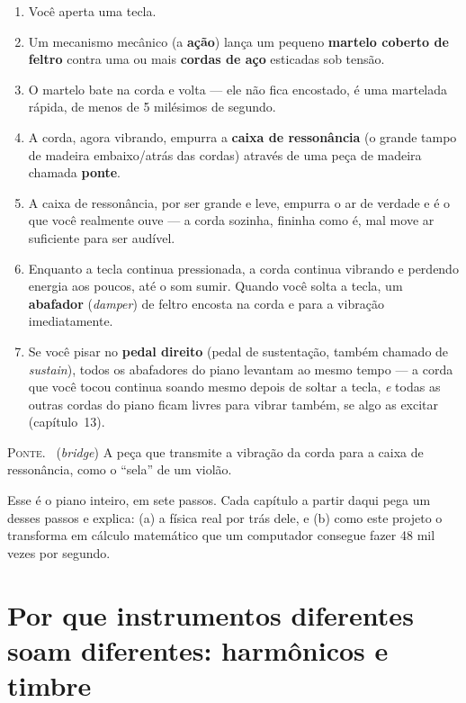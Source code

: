 \documentclass[11pt,oneside]{book}
\newcommand{\nova}[1]{\textsc{\color{accent}#1.}~}
\begin{document}
\begin{enumerate}[leftmargin=1.6em]
\item Você aperta uma tecla.
\item Um mecanismo mecânico (a \textbf{ação}) lança um pequeno
\textbf{martelo coberto de feltro} contra uma ou mais \textbf{cordas de
aço} esticadas sob tensão.
\item O martelo bate na corda e volta --- ele não fica encostado, é uma
martelada rápida, de menos de 5 milésimos de segundo.
\item A corda, agora vibrando, empurra a \textbf{caixa de ressonância} (o
grande tampo de madeira embaixo/atrás das cordas) através de uma peça de
madeira chamada \textbf{ponte}.
\item A caixa de ressonância, por ser grande e leve, empurra o ar de
verdade e é o que você realmente ouve --- a corda sozinha, fininha como é,
mal move ar suficiente para ser audível.
\item Enquanto a tecla continua pressionada, a corda continua vibrando e
perdendo energia aos poucos, até o som sumir. Quando você solta a tecla, um
\textbf{abafador} (\emph{damper}) de feltro encosta na corda e para a
vibração imediatamente.
\item Se você pisar no \textbf{pedal direito} (pedal de sustentação,
também chamado de \emph{sustain}), todos os abafadores do piano levantam
ao mesmo tempo --- a corda que você tocou continua soando mesmo depois de
soltar a tecla, \emph{e} todas as outras cordas do piano ficam livres para
vibrar também, se algo as excitar (capítulo~13).
\end{enumerate}

\begin{newword}
\nova{Ponte} (\emph{bridge}) A peça que transmite a vibração da corda para
a caixa de ressonância, como o \enquote{sela} de um violão.
\end{newword}

Esse é o piano inteiro, em sete passos. Cada capítulo a partir daqui pega
um desses passos e explica: (a) a física real por trás dele, e (b) como
este projeto o transforma em cálculo matemático que um computador consegue
fazer 48 mil vezes por segundo.

\chapter{Por que instrumentos diferentes soam diferentes: harmônicos e timbre}
\end{document}
